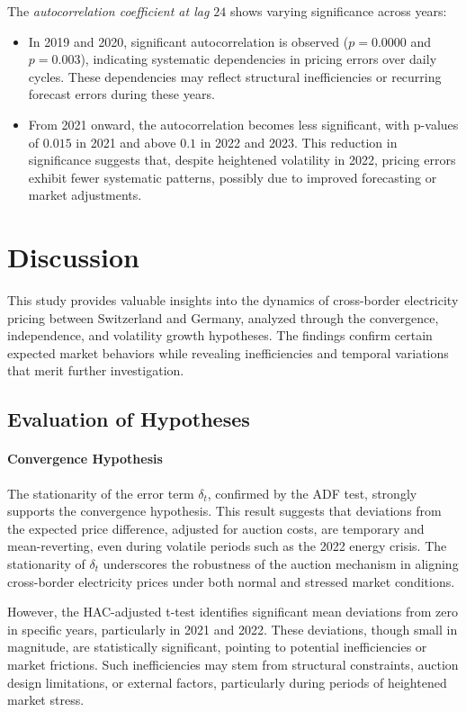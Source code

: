 \documentclass[12pt]{article}
\begin{document}
The \textit{autocorrelation coefficient at lag $24$} shows varying significance across years:
\begin{itemize}
    \item In 2019 and 2020, significant autocorrelation is observed ($p = 0.0000$ and $p = 0.003$), indicating systematic dependencies in pricing errors over daily cycles. These dependencies may reflect structural inefficiencies or recurring forecast errors during these years.
    \item From 2021 onward, the autocorrelation becomes less significant, with p-values of $0.015$ in 2021 and above $0.1$ in 2022 and 2023. This reduction in significance suggests that, despite heightened volatility in 2022, pricing errors exhibit fewer systematic patterns, possibly due to improved forecasting or market adjustments.
\end{itemize}

\section{Discussion}

This study provides valuable insights into the dynamics of cross-border electricity pricing between Switzerland and Germany, analyzed through the convergence, independence, and volatility growth hypotheses. The findings confirm certain expected market behaviors while revealing inefficiencies and temporal variations that merit further investigation.

\subsection{Evaluation of Hypotheses}

\paragraph{Convergence Hypothesis}

The stationarity of the error term $\delta_t$, confirmed by the ADF test, strongly supports the convergence hypothesis. This result suggests that deviations from the expected price difference, adjusted for auction costs, are temporary and mean-reverting, even during volatile periods such as the 2022 energy crisis. The stationarity of $\delta_t$ underscores the robustness of the auction mechanism in aligning cross-border electricity prices under both normal and stressed market conditions.

However, the HAC-adjusted t-test identifies significant mean deviations from zero in specific years, particularly in 2021 and 2022. These deviations, though small in magnitude, are statistically significant, pointing to potential inefficiencies or market frictions. Such inefficiencies may stem from structural constraints, auction design limitations, or external factors, particularly during periods of heightened market stress.
\end{document}
